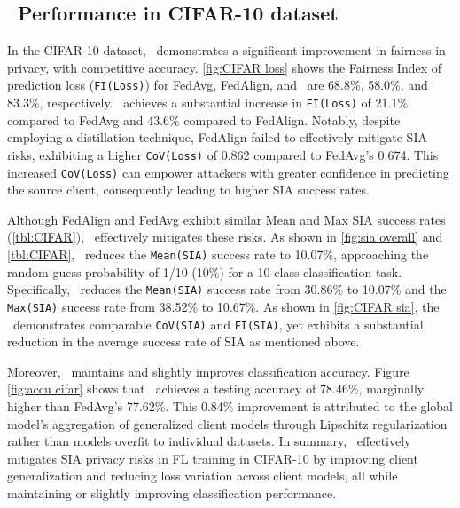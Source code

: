 \subsection{\sysname\ Performance in CIFAR-10 dataset} \label{sec:CIFAReval}
In the CIFAR-10 dataset, \sysname\ demonstrates a significant improvement in fairness in privacy, with competitive accuracy. \autoref{fig:CIFAR loss} shows the Fairness Index of prediction loss (\texttt{FI(Loss)}) for FedAvg, FedAlign, and \sysname\ are 68.8\%, 58.0\%, and 83.3\%, respectively.  \sysname\ achieves a substantial increase in \texttt{FI(Loss)} of 21.1\% compared to FedAvg and 43.6\% compared to FedAlign. Notably, despite employing a distillation technique, FedAlign failed to effectively mitigate SIA risks, exhibiting a higher \texttt{CoV(Loss)} of 0.862 compared to FedAvg's 0.674. This increased \texttt{CoV(Loss)} can empower attackers with greater confidence in predicting the source client, consequently leading to higher SIA success rates.

Although FedAlign and FedAvg exhibit similar Mean and Max SIA success rates (\autoref{tbl:CIFAR}), \sysname\ effectively mitigates these risks. As shown in \autoref{fig:sia overall} and \autoref{tbl:CIFAR}, \sysname\ reduces the \texttt{Mean(SIA)} success rate to 10.07\%, approaching the random-guess probability of 1/10 (10\%) for a 10-class classification task.  Specifically, \sysname\ reduces the \texttt{Mean(SIA)} success rate from 30.86\% to 10.07\% and the \texttt{Max(SIA)} success rate from 38.52\% to 10.67\%. As shown in \autoref{fig:CIFAR sia}, the \sysname\ demonstrates comparable \texttt{CoV(SIA)} and \texttt{FI(SIA)}, yet exhibits a substantial reduction in the average success rate of SIA as mentioned above.

Moreover, \sysname\ maintains and slightly improves classification accuracy.  Figure \ref{fig:accu cifar} shows that \sysname\ achieves a testing accuracy of 78.46\%, marginally higher than FedAvg's 77.62\%. This 0.84\% improvement is attributed to the global model's aggregation of generalized client models through Lipschitz regularization rather than models overfit to individual datasets.  In summary, \sysname\ effectively mitigates SIA privacy risks in FL training in CIFAR-10 by improving client generalization and reducing loss variation across client models, all while maintaining or slightly improving classification performance.








